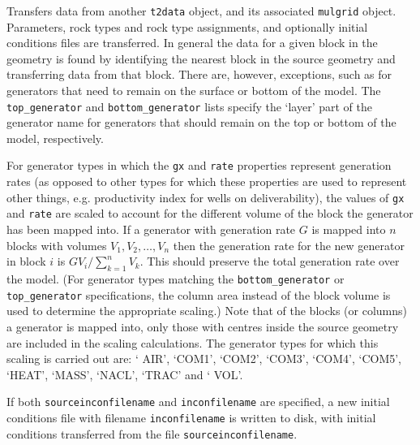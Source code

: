 Transfers data from another \texttt{t2data} object, and its associated \texttt{mulgrid} object.  Parameters, rock types and rock type assignments, and optionally initial conditions files are transferred.  In general the data for a given block in the geometry is found by identifying the nearest block in the source geometry and transferring data from that block.  There are, however, exceptions, such as for generators that need to remain on the surface or bottom of the model.  The \texttt{top\_generator} and \texttt{bottom\_generator} lists specify the `layer' part of the generator name for generators that should remain on the top or bottom of the model, respectively.

For generator types in which the \texttt{gx} and \texttt{rate} properties represent generation rates (as opposed to other types for which these properties are used to represent other things, e.g. productivity index for wells on deliverability), the values of \texttt{gx} and \texttt{rate} are scaled to account for the different volume of the block the generator has been mapped into.  If a generator with generation rate $G$ is mapped into $n$ blocks with volumes $V_1, V_2,\ldots, V_n$ then the generation rate for the new generator in block $i$ is $G V_i/\sum_{k=1}^{n}{V_k}$.  This should preserve the total generation rate over the model.  (For generator types matching the \texttt{bottom\_generator} or \texttt{top\_generator} specifications, the column area instead of the block volume is used to determine the appropriate scaling.)  Note that of the blocks (or columns) a generator is mapped into, only those with centres inside the source geometry are included in the scaling calculations.  The generator types for which this scaling is carried out are: ` AIR', `COM1', `COM2', `COM3', `COM4', `COM5', `HEAT', `MASS', `NACL', `TRAC'  and ` VOL'.

If both \texttt{sourceinconfilename} and \texttt{inconfilename} are specified, a new initial conditions file with filename \texttt{inconfilename} is written to disk, with initial conditions transferred from the file \texttt{sourceinconfilename}.

